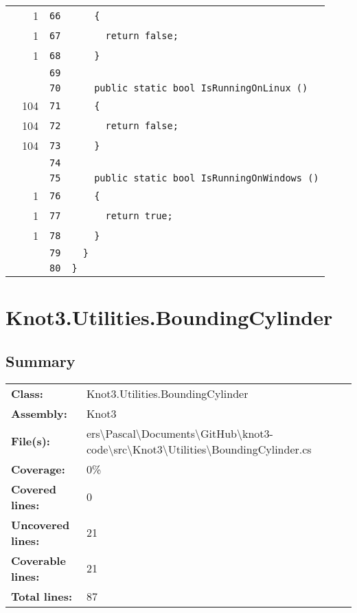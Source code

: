 \documentclass[a4paper,10pt]{article}
\begin{document}
\begin{longtable}[l]{lrrl}
\cellcolor{green} & 1 & \verb~66~ & \verb~    {~\\
\cellcolor{green} & 1 & \verb~67~ & \verb~      return false;~\\
\cellcolor{green} & 1 & \verb~68~ & \verb~    }~\\
\cellcolor{gray} &  & \verb~69~ & \verb~~\\
\cellcolor{gray} &  & \verb~70~ & \verb~    public static bool IsRunningOnLinux ()~\\
\cellcolor{green} & 104 & \verb~71~ & \verb~    {~\\
\cellcolor{green} & 104 & \verb~72~ & \verb~      return false;~\\
\cellcolor{green} & 104 & \verb~73~ & \verb~    }~\\
\cellcolor{gray} &  & \verb~74~ & \verb~~\\
\cellcolor{gray} &  & \verb~75~ & \verb~    public static bool IsRunningOnWindows ()~\\
\cellcolor{green} & 1 & \verb~76~ & \verb~    {~\\
\cellcolor{green} & 1 & \verb~77~ & \verb~      return true;~\\
\cellcolor{green} & 1 & \verb~78~ & \verb~    }~\\
\cellcolor{gray} &  & \verb~79~ & \verb~  }~\\
\cellcolor{gray} &  & \verb~80~ & \verb~}~\\
\end{longtable}
\newpage
\section{Knot3.Utilities.BoundingCylinder}
\subsection{Summary}
\begin{longtable}[l]{ll}
\textbf{Class:} & Knot3.Utilities.BoundingCylinder\\
\textbf{Assembly:} & Knot3\\
\textbf{File(s):} & \begin{minipage}[t]{12cm}{ers\textbackslash Pascal\textbackslash Documents\textbackslash GitHub\textbackslash knot3-code\textbackslash src\textbackslash Knot3\textbackslash Utilities\textbackslash BoundingCylinder.cs}\end{minipage} \\
\textbf{Coverage:} & 0\%\\
\textbf{Covered lines:} & 0\\
\textbf{Uncovered lines:} & 21\\
\textbf{Coverable lines:} & 21\\
\textbf{Total lines:} & 87\\
\end{longtable}
\end{document}
